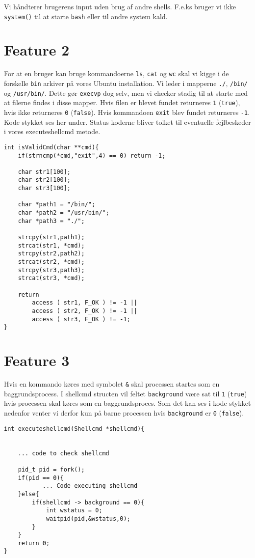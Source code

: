 \documentclass[danish]{report}
\begin{document}
Vi håndterer brugerens input uden brug af andre shells. F.e.ks bruger vi ikke {\tt system()} til at starte {\tt bash} eller til andre system kald. 


\section{Feature 2}

For at en bruger kan bruge kommandoerne {\tt ls}, {\tt cat} og {\tt wc} skal vi kigge i de forskelle {\tt bin} arkiver på vores Ubuntu installation. Vi leder i mapperne {\tt ./}, {\tt /bin/} og {\tt /usr/bin/}. Dette gør {\tt execvp} dog selv, men vi checker stadig til at starte med at filerne findes i disse mapper. Hvis filen er blevet fundet returneres {\tt 1} ({\tt true}), hvis ikke returneres {\tt 0} ({\tt false}). Hvis kommandoen {\tt exit} blev fundet returneres {\tt -1}. Kode stykket ses her under. Status koderne bliver tolket til eventuelle fejlbeskeder i vores executeshellcmd metode.

\begin{lstlisting}
int isValidCmd(char **cmd){
    if(strncmp(*cmd,"exit",4) == 0) return -1;

    char str1[100];
    char str2[100];
    char str3[100];

    char *path1 = "/bin/";
    char *path2 = "/usr/bin/";
    char *path3 = "./";

    strcpy(str1,path1);
    strcat(str1, *cmd);
    strcpy(str2,path2);
    strcat(str2, *cmd);
    strcpy(str3,path3);
    strcat(str3, *cmd);

    return 
        access ( str1, F_OK ) != -1 || 
        access ( str2, F_OK ) != -1 || 
        access ( str3, F_OK ) != -1;
}
\end{lstlisting}


\section{Feature 3}

Hvis en kommando køres med symbolet {\tt \&} skal processen startes som en baggrundsprocess. I shellcmd structen vil feltet {\tt background} være sat til {\tt 1} ({\tt true}) hvis processen skal køres som en baggrundsproces. Som det kan ses i kode stykket nedenfor venter vi derfor kun på barne processen hvis {\tt background} er {\tt 0} ({\tt false}).
\begin{lstlisting}
int executeshellcmd(Shellcmd *shellcmd){
    

    ... code to check shellcmd

    pid_t pid = fork();
    if(pid == 0){
           ... Code executing shellcmd
    }else{
        if(shellcmd -> background == 0){
            int wstatus = 0;    
            waitpid(pid,&wstatus,0);
        }
    }
    return 0;
}
\end{lstlisting}
\end{document}
